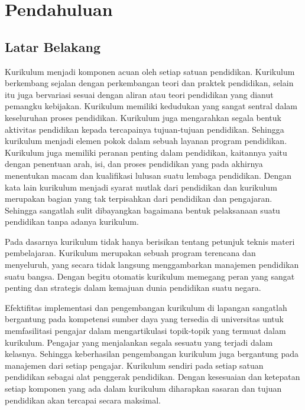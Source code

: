 \chapter{Pendahuluan}
\label{chap:Pendahuluan}
   
\section{Latar Belakang}
\label{sec:Latar Belakang}

Kurikulum menjadi komponen acuan oleh setiap satuan pendidikan. Kurikulum berkembang sejalan dengan perkembangan teori dan praktek pendidikan, selain itu juga bervariasi sesuai dengan aliran atau teori pendidikan yang dianut pemangku kebijakan. Kurikulum memiliki kedudukan yang sangat sentral dalam keseluruhan proses pendidikan. Kurikulum juga mengarahkan segala bentuk aktivitas pendidikan kepada tercapainya tujuan-tujuan pendidikan. Sehingga kurikulum menjadi elemen pokok dalam sebuah layanan program pendidikan. Kurikulum juga memiliki peranan penting dalam pendidikan, kaitannya yaitu dengan penentuan arah, isi, dan proses pendidikan yang pada akhirnya menentukan macam dan kualifikasi lulusan suatu lembaga pendidikan. Dengan kata lain kurikulum menjadi syarat mutlak dari pendidikan dan kurikulum merupakan bagian yang tak terpisahkan dari pendidikan dan pengajaran. Sehingga sangatlah sulit dibayangkan bagaimana bentuk pelaksanaan suatu pendidikan tanpa adanya kurikulum.

Pada dasarnya kurikulum tidak hanya berisikan tentang petunjuk teknis materi pembelajaran. Kurikulum merupakan sebuah program terencana dan menyeluruh, yang secara tidak langsung menggambarkan manajemen pendidikan suatu bangsa. Dengan begitu otomatis kurikulum memegang peran yang sangat penting dan strategis dalam kemajuan dunia pendidikan suatu negara.

Efektifitas implementasi dan pengembangan kurikulum di lapangan sangatlah bergantung pada kompetensi sumber daya yang tersedia di universitas untuk memfasilitasi pengajar dalam mengartikulasi topik-topik yang termuat dalam kurikulum. Pengajar yang menjalankan segala sesuatu yang terjadi dalam kelasnya. Sehingga keberhasilan pengembangan kurikulum juga bergantung pada manajemen dari setiap pengajar. Kurikulum sendiri pada setiap satuan pendidikan sebagai alat penggerak pendidikan. Dengan kesesuaian dan ketepatan setiap komponen yang ada dalam kurikulum diharapkan sasaran dan tujuan pendidikan akan tercapai secara maksimal.

